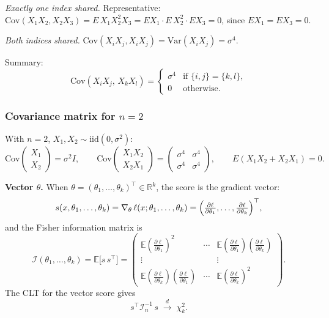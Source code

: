 \documentclass[a4paper,oneside,12pt]{extarticle}
\theoremstyle{plain}
\theoremstyle{definition}
\theoremstyle{remark}
\newcommand*{\E}{\mathbb{E}}
\newcommand*{\Var}{\mathrm{Var}}
\newcommand*{\Cov}{\mathrm{Cov}}
\begin{document}
\smallskip
\noindent\textit{Exactly one index shared.}
Representative: $\Cov(X_1X_2,X_2X_3)=E\,X_1X_2^2X_3=EX_1\cdot
E\,X_2^2\cdot EX_3=0$, since $EX_1=EX_3=0$.

\smallskip
\noindent\textit{Both indices shared.}
$\Cov(X_iX_j,X_iX_j)=\Var(X_iX_j)=\sigma^4$.

\smallskip\noindent
Summary:
\[
  \Cov(X_iX_j,\,X_kX_l)
  = \begin{cases}
      \sigma^4 & \text{if }\{i,j\}=\{k,l\},\\
      0        & \text{otherwise.}
    \end{cases}
\]

\subsubsection*{Covariance matrix for $n=2$}

With $n=2$, $X_1,X_2\sim\mathrm{iid}(0,\sigma^2)$:
\[
  \Cov\!\begin{pmatrix}X_1\\X_2\end{pmatrix}
  = \sigma^2 I,
  \qquad
  \Cov\!\begin{pmatrix}X_1X_2\\X_2X_1\end{pmatrix}
  = \begin{pmatrix}\sigma^4&\sigma^4\\\sigma^4&\sigma^4\end{pmatrix},
  \qquad
  E(X_1X_2+X_2X_1)=0.
\]


\medskip
\noindent\textbf{Vector $\theta$.}
When $\theta=(\theta_1,\ldots,\theta_k)^\top\in\mathbb{R}^k$, the
score is the gradient vector:
\[
  s(x,\theta_1,\ldots,\theta_k)
  = \nabla_\theta\,\ell(x;\theta_1,\ldots,\theta_k)
  = \Bigl(
      \tfrac{\partial\ell}{\partial\theta_1},\ldots,
      \tfrac{\partial\ell}{\partial\theta_k}
    \Bigr)^\top,
\]
and the Fisher information matrix is
\[
  \mathcal{I}(\theta_1,\ldots,\theta_k)
  = \E\bigl[s\,s^\top\bigr]
  = \begin{pmatrix}
      \E\!\left(\tfrac{\partial\ell}{\partial\theta_1}\right)^{\!2}
      & \cdots &
      \E\!\left(\tfrac{\partial\ell}{\partial\theta_1}\right)
       \!\left(\tfrac{\partial\ell}{\partial\theta_k}\right) \\[4pt]
      \vdots & & \vdots \\[2pt]
      \E\!\left(\tfrac{\partial\ell}{\partial\theta_k}\right)
       \!\left(\tfrac{\partial\ell}{\partial\theta_1}\right)
      & \cdots &
      \E\!\left(\tfrac{\partial\ell}{\partial\theta_k}\right)^{\!2}
    \end{pmatrix}.
\]
The CLT for the vector score gives
\[
  s^\top \mathcal{I}_n^{-1}\, s
  \;\xrightarrow{d}\; \chi^2_k.
\]
\end{document}
